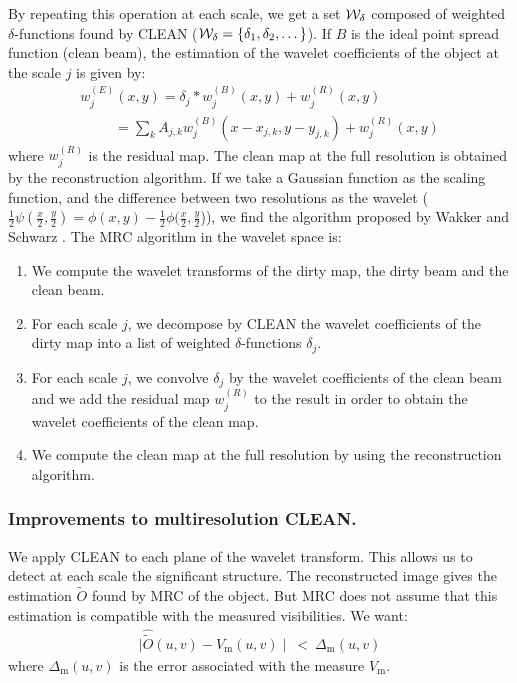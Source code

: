  By repeating this operation at each scale, we get
a set ${\cal W}_\delta$ 
composed of weighted $\delta$-functions  found by CLEAN 
($ {\cal W}_\delta= \{\delta_1, \delta_2, \dots\}$).
If $B$ is the ideal point spread function (clean beam),
the estimation of the wavelet coefficients of the object at the scale $j$
is given by:
\begin{eqnarray}
w_j^{(E)}(x,y) = \delta_j * w_j^{(B)}(x,y) + w^{(R)}_j (x,y)  \\ \nonumber
\ \ \ \ \ \ \ \ \ \ \ = \sum_k A_{j,k}
 w_j^{(B)}(x-x_{j,k},y-y_{j,k}) + w^{(R)}_j(x,y)
\end{eqnarray}
where $w^{(R)}_j $ is the residual map.
The clean map at the full resolution is obtained by the reconstruction 
algorithm.
If we take a Gaussian function as the scaling function, and the difference 
between
two resolutions as the wavelet ($\frac{1}{2}\psi
(\frac{x}{2},\frac{y}{2})=\phi(x,y) - 
\frac{1}{2}\phi(\frac{x}{2},\frac{y}{2}$)), we find the algorithm 
proposed by
Wakker and Schwarz \cite{rest:wakker88}. The MRC algorithm in the wavelet space is:
\begin{enumerate}
\item We compute the wavelet transforms of the dirty map, the dirty beam 
and the clean beam.
\item For each scale $j$, we decompose by CLEAN the wavelet coefficients 
of the 
dirty map into a list of weighted $\delta$-functions $\delta_j$.
\item For each scale $j$, we convolve  $\delta_j$ by the wavelet 
coefficients of the clean beam and we add the residual map $w^{(R)}_j$ 
to the result in order to obtain the  wavelet coefficients of the clean map.
\item We compute  the clean map at the full resolution by using the 
reconstruction algorithm.
\end{enumerate}

 
\subsubsection{Improvements to multiresolution CLEAN.}

We apply CLEAN to each plane of the wavelet transform. This allows us to
detect at each scale the significant structure. The reconstructed image
 gives the estimation $\tilde{O}$ found by MRC of the object. But MRC does
not
assume that this estimation is compatible with the measured visibilities.
We want:
 \begin{eqnarray}
\mid \hat{\tilde{O}}(u,v) - V_{\mbox{m}}(u,v)\mid \ < \ \Delta_{\mbox{m}}(u,v)
\end{eqnarray}
 where $\Delta_{\mbox{m}}(u,v)$ is the error associated with the measure 
$V_{\mbox{m}}$.

